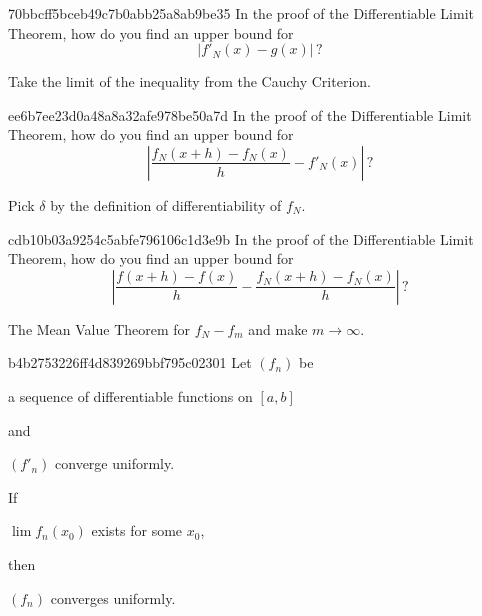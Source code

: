 \begin{note}{70bbcff5bceb49c7b0abb25a8ab9be35}
    In the proof of the Differentiable Limit Theorem, how do you find an upper bound for
    \[
        \left\lvert f'_N(x) - g(x) \right\rvert\,?
    \]

    \begin{cloze}{1}
        Take the limit of the inequality from the Cauchy Criterion.
    \end{cloze}
\end{note}

\begin{note}{ee6b7ee23d0a48a8a32afe978be50a7d}
    In the proof of the Differentiable Limit Theorem, how do you find an upper bound for
    \[
        \left\lvert \frac{f_N(x + h) - f_N(x)}{h} - f'_N(x) \right\rvert\,?
    \]

    \begin{cloze}{1}
        Pick \({ \delta }\) by the definition of differentiability of \({ f_N }\).
    \end{cloze}
\end{note}

\begin{note}{cdb10b03a9254c5abfe796106c1d3e9b}
    In the proof of the Differentiable Limit Theorem, how do you find an upper bound for
    \[
        \left\lvert \frac{f(x + h) - f(x)}{h} - \frac{f_{N}(x + h) - f_N(x)}{h} \right\rvert\,?
    \]

    \begin{cloze}{1}
        The Mean Value Theorem for \({ f_N - f_m }\) and make \({ m \to \infty }\).
    \end{cloze}
\end{note}

\begin{note}{b4b2753226ff4d839269bbf795c02301}
    Let \({ (f_n) }\) be \begin{icloze}{4}a sequence of differentiable functions on \({ [a, b] }\)\end{icloze} and \begin{icloze}{3}\({ (f'_n) }\) converge uniformly.\end{icloze}
    If \begin{icloze}{2}\({ \lim f_n(x_0) }\) exists for some \({ x_0 }\),\end{icloze} then \begin{icloze}{1}\({ (f_n) }\) converges uniformly.\end{icloze}
\end{note}

